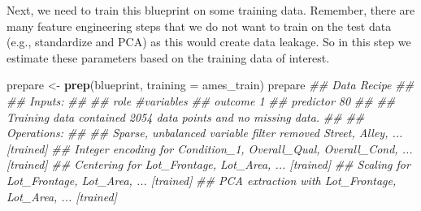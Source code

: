 \documentclass[]{krantz}
\makeatletter
\newenvironment{Shaded}{\begin{snugshade}}{\end{snugshade}}
\newcommand{\CommentTok}[1]{\textcolor[rgb]{0.37,0.37,0.37}{\textit{#1}}}
\newcommand{\DataTypeTok}[1]{\textcolor[rgb]{0.27,0.27,0.27}{#1}}
\newcommand{\KeywordTok}[1]{\textcolor[rgb]{0.27,0.27,0.27}{\textbf{#1}}}
\newcommand{\NormalTok}[1]{#1}
\newcommand{\OperatorTok}[1]{\textcolor[rgb]{0.43,0.43,0.43}{\textbf{#1}}}
\newcommand{\StringTok}[1]{\textcolor[rgb]{0.5,0.5,0.5}{#1}}
\newenvironment{kframe}{%
\medskip{}
\setlength{\fboxsep}{.8em}
 \def\at@end@of@kframe{}%
 \ifinner\ifhmode%
  \def\at@end@of@kframe{\end{minipage}}%
  \begin{minipage}{\columnwidth}%
 \fi\fi%
 \def\FrameCommand##1{\hskip\@totalleftmargin \hskip-\fboxsep
 \colorbox{shadecolor}{##1}\hskip-\fboxsep
     \hskip-\linewidth \hskip-\@totalleftmargin \hskip\columnwidth}%
 \MakeFramed {\advance\hsize-\width
   \@totalleftmargin\z@ \linewidth\hsize
   \@setminipage}}%
 {\par\unskip\endMakeFramed%
 \at@end@of@kframe}
\renewenvironment{Shaded}{\begin{kframe}}{\end{kframe}}
\makeatother
\begin{document}
\begin{Shaded}
\end{Shaded}

Next, we need to train this blueprint on some training data. Remember, there are many feature engineering steps that we do not want to train on the test data (e.g., standardize and PCA) as this would create data leakage. So in this step we estimate these parameters based on the training data of interest.

\begin{Shaded}
\begin{Highlighting}[]
\NormalTok{prepare <-}\StringTok{ }\KeywordTok{prep}\NormalTok{(blueprint, }\DataTypeTok{training =}\NormalTok{ ames_train)}
\NormalTok{prepare}
\CommentTok{## Data Recipe}
\CommentTok{## }
\CommentTok{## Inputs:}
\CommentTok{## }
\CommentTok{##       role #variables}
\CommentTok{##    outcome          1}
\CommentTok{##  predictor         80}
\CommentTok{## }
\CommentTok{## Training data contained 2054 data points and no missing data.}
\CommentTok{## }
\CommentTok{## Operations:}
\CommentTok{## }
\CommentTok{## Sparse, unbalanced variable filter removed Street, Alley, ... [trained]}
\CommentTok{## Integer encoding for Condition_1, Overall_Qual, Overall_Cond, ... [trained]}
\CommentTok{## Centering for Lot_Frontage, Lot_Area, ... [trained]}
\CommentTok{## Scaling for Lot_Frontage, Lot_Area, ... [trained]}
\CommentTok{## PCA extraction with Lot_Frontage, Lot_Area, ... [trained]}
\end{Highlighting}
\end{Shaded}
\end{document}
